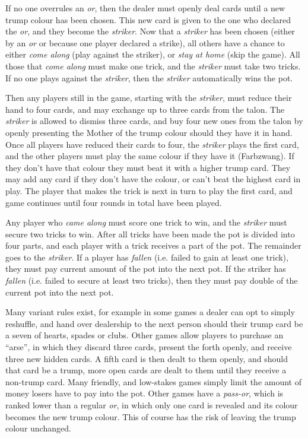 If no one overrules an \emph{or}, then the dealer must openly deal cards until
a new trump colour has been chosen. This new card is given to the one who
declared the \emph{or}, and they become the \emph{striker}. Now that a
\emph{striker} has been chosen (either by an \emph{or} or because one player
declared a strike), all others have a chance to either \emph{come along} (play
against the striker), or \emph{stay at home} (skip the game). All those that
\emph{come along} must make one trick, and the \emph{striker} must take two
tricks. If no one plays against the \emph{striker}, then the \emph{striker}
automatically wins the pot.

Then any players still in the game, starting with the \emph{striker}, must
reduce their hand to four cards, and may exchange up to three cards from the
talon. The \emph{striker} is allowed to dismiss three cards, and buy four new
ones from the talon by openly presenting the Mother of the trump colour should
they have it in hand. Once all players have reduced their cards to four, the
\emph{striker} plays the first card, and the other players must play the same
colour if they have it (Farbzwang). If they don't have that colour they must
beat it with a higher trump card. They may add any card if they don't have the
colour, or can't beat the highest card in play. The player that makes the
trick is next in turn to play the first card, and game continues until four
rounds in total have been played.

Any player who \emph{came along} must score one trick to win, and the
\emph{striker} must secure two tricks to win. After all tricks have been made
the pot is divided into four parts, and each player with a trick receives a
part of the pot. The remainder goes to the \emph{striker}. If a player has
\emph{fallen} (i.e. failed to gain at least one trick), they must pay current
amount of the pot into the next pot. If the striker has \emph{fallen} (i.e.
failed to secure at least two tricks), then they must pay double of the
current pot into the next pot.


Many variant rules exist, for example in some games a dealer can opt to simply
reshuffle, and hand over dealership to the next person should their trump card
be a seven of hearts, spades or clubs. Other games allow players to purchase
an ``arse'', in which they discard three cards, present the forth openly, and
receive three new hidden cards. A fifth card is then dealt to them openly, and
should that card be a trump, more open cards are dealt to them until they
receive a non-trump card. Many friendly, and low-stakes games simply limit the
amount of money losers have to pay into the pot. Other games have a
\emph{pass-or}, which is ranked lower than a regular \emph{or}, in which only
one card is revealed and its colour becomes the new trump colour. This of
course has the risk of leaving the trump colour unchanged.
